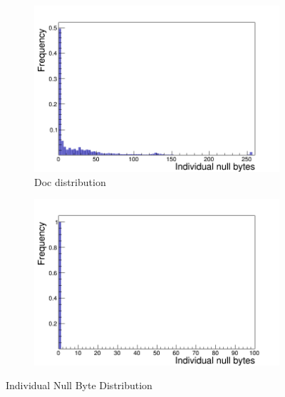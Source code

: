 \begin{figure}[H]
   \begin{subfigure}[b]{.5\linewidth}
    \raggedleft
     \includegraphics[scale=0.33]{./Figures/null_bytes/Indi_Null_Bytes_doc}
   \caption{Doc distribution}
    \label{fig:1c}
  \end{subfigure}%
  \begin{subfigure}[b]{.5\linewidth}
    \raggedright
        \includegraphics[scale=0.33]{./Figures/null_bytes/Indi_Null_Bytes_text}
    \label{fig:1d}
  \end{subfigure}
  
  
  \caption{Individual Null Byte Distribution}
  \label{fig:null_bytes}
  
\end{figure}